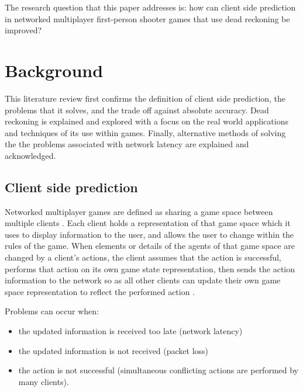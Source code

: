 \documentclass[journal]{IEEEtran}
\begin{document}
The research question that this paper addresses is: how can client side prediction in networked multiplayer first-person shooter games that use dead reckoning be improved?

\section{Background}

This literature review first confirms the definition of client side prediction, the problems that it solves, and the trade off against absolute accuracy. Dead reckoning is explained and explored with a focus on the real world applications and techniques of its use within games. Finally, alternative methods of solving the the problems associated with network latency are explained and acknowledged.

\subsection{Client side prediction}

Networked multiplayer games are defined as sharing a game space between multiple clients \cite{diot1999distributed}. Each client holds a representation of that game space which it uses to display information to the user, and allows the user to change within the rules of the game. When elements or details of the agents of that game space are changed by a client's actions, the client assumes that the action is successful, performs that action on its own game state representation, then sends the action information to the network so as all other clients can update their own game space representation to reflect the performed action \cite{bernier2001latency}.

Problems can occur when:
\begin{itemize}
    \item the updated information is received too late (network latency)
    \item the updated information is not received (packet loss)
    \item the action is not successful (simultaneous conflicting actions are performed by many clients).
\end{itemize}
\end{document}
